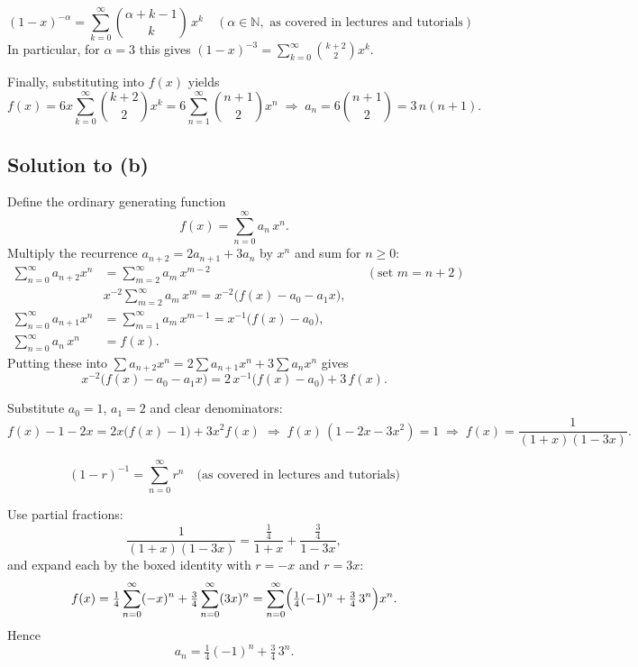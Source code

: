 \documentclass[docmute]{article}
\begin{document}
\[
\boxed{
(1 - x)^{-\alpha}
= \sum_{k=0}^\infty \binom{\alpha + k - 1}{k}\,x^k
\quad(\alpha\in\mathbb{N},\text{ as covered in lectures and tutorials})
}
\]
\noindent
In particular, for \(\alpha=3\) this gives \((1-x)^{-3}=\sum_{k=0}^\infty\binom{k+2}{2}x^k\).

Finally, substituting into \(f(x)\) yields
\[
f(x)
= 6x\sum_{k=0}^\infty\binom{k+2}{2}x^k
= 6\sum_{n=1}^\infty\binom{n+1}{2}x^n
\;\Longrightarrow\;
a_n = 6\binom{n+1}{2} = 3\,n(n+1).
\]


\subsection*{Solution to (b)}
Define the ordinary generating function
\[
f(x)=\sum_{n=0}^\infty a_n\,x^n.
\]
Multiply the recurrence \(a_{n+2}=2a_{n+1}+3a_n\) by \(x^n\) and sum for \(n\ge0\):
\begin{align*}
\sum_{n=0}^\infty a_{n+2}x^n
&= \sum_{m=2}^\infty a_m\,x^{m-2}
 &&(\text{set }m=n+2)\\
& x^{-2}\sum_{m=2}^\infty a_m\,x^m
 = x^{-2}\bigl(f(x)-a_0 - a_1x\bigr),\\
\sum_{n=0}^\infty a_{n+1}x^n
&= \sum_{m=1}^\infty a_m\,x^{m-1}
 = x^{-1}\bigl(f(x)-a_0\bigr),\\
\sum_{n=0}^\infty a_n\,x^n
&= f(x).
\end{align*}
Putting these into 
\(\sum a_{n+2}x^n = 2\sum a_{n+1}x^n + 3\sum a_n x^n\)
gives
\[
x^{-2}\bigl(f(x)-a_0 - a_1x\bigr)
=2\,x^{-1}\bigl(f(x)-a_0\bigr)
+3\,f(x).
\]


Substitute \(a_0=1\), \(a_1=2\) and clear denominators:
\[
f(x)-1-2x
=2x\bigl(f(x)-1\bigr)+3x^2f(x)
\;\Longrightarrow\;
f(x)\,(1-2x-3x^2)=1
\;\Longrightarrow\;
f(x)=\frac{1}{(1+x)(1-3x)}.
\]

\[
\boxed{
(1 - r)^{-1}
= \sum_{n=0}^\infty r^n
\quad\text{(as covered in lectures and tutorials)}
}
\]

Use partial fractions:
\[
\frac{1}{(1+x)(1-3x)}
=\frac{\tfrac14}{1+x}+\frac{\tfrac34}{1-3x},
\]
and expand each by the boxed identity with \(r=-x\) and \(r=3x\):
\[
f(x)
=\tfrac14\sum_{n=0}^\infty(-x)^n
+\tfrac34\sum_{n=0}^\infty(3x)^n
=\sum_{n=0}^\infty\Bigl(\tfrac14(-1)^n+\tfrac34\,3^n\Bigr)x^n.
\]
Hence
\[
\boxed{a_n = \tfrac14(-1)^n + \tfrac34\,3^n.}
\]


\end{document}
